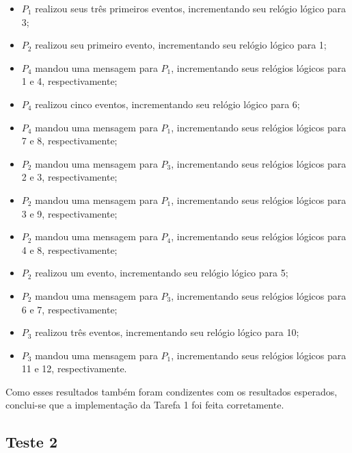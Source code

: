 \documentclass[conference]{IEEEtran}
\begin{document}
\begin{itemize}
\item $P_1$ realizou seus três primeiros eventos, incrementando seu relógio lógico para 3;
\item $P_2$ realizou seu primeiro evento, incrementando seu relógio lógico para 1;
\item $P_4$ mandou uma mensagem para $P_1$, incrementando seus relógios lógicos para 1 e 4, respectivamente;
\item $P_4$ realizou cinco eventos, incrementando seu relógio lógico para 6;
\item $P_4$ mandou uma mensagem para $P_1$, incrementando seus relógios lógicos para 7 e 8, respectivamente;
\item $P_2$ mandou uma mensagem para $P_3$, incrementando seus relógios lógicos para 2 e 3, respectivamente;
\item $P_2$ mandou uma mensagem para $P_1$, incrementando seus relógios lógicos para 3 e 9, respectivamente;
\item $P_2$ mandou uma mensagem para $P_4$, incrementando seus relógios lógicos para 4 e 8, respectivamente;
\item $P_2$ realizou um evento, incrementando seu relógio lógico para 5;
\item $P_2$ mandou uma mensagem para $P_3$, incrementando seus relógios lógicos para 6 e 7, respectivamente;
\item $P_3$ realizou três eventos, incrementando seu relógio lógico para 10;
\item $P_3$ mandou uma mensagem para $P_1$, incrementando seus relógios lógicos para 11 e 12, respectivamente.
\end{itemize}




	Como esses resultados também foram condizentes com os resultados esperados, conclui-se que a implementação da Tarefa 1 foi feita corretamente.

\subsection{Teste 2}
\end{document}
